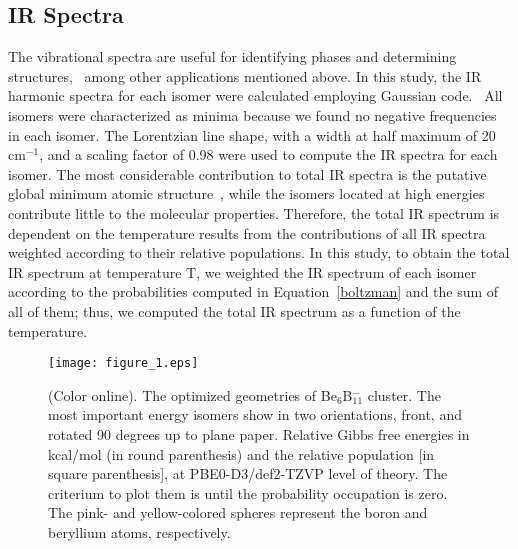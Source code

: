 \documentclass[prb,aps,preprint,showkeys,showpacs]{revtex4}
\begin{document}
\subsection{IR Spectra}
The vibrational spectra are useful for identifying phases and determining structures,~\cite{Kubicki_2019} among other applications mentioned above. In this study, the IR harmonic spectra for each isomer were calculated employing Gaussian code.~\cite{gauss} All isomers were characterized as minima because we found no negative frequencies in each isomer. The Lorentzian line shape, with a width at half maximum of 20 cm$^{-1}$, and a scaling factor of 0.98 were used to compute the IR spectra for each isomer. The most considerable contribution to total IR spectra is the putative global minimum atomic structure~\cite{Felix}, while the isomers located at high energies contribute little to the molecular properties. Therefore, the total IR spectrum is dependent on the temperature results from the contributions of all IR spectra weighted according to their relative populations. In this study, to obtain the total IR spectrum at temperature T, we weighted the IR spectrum of each isomer according to the probabilities computed in Equation~\ref{boltzman} and the sum of all of them; thus, we computed the total IR spectrum as a function of the temperature.
\begin{figure}[ht!]
\begin{center}  
  \texttt{[image: figure\_1.eps]}
\caption{(Color online). The optimized geometries of Be$_{6}$B$_{11}^{-}$ cluster. The most important energy isomers show in two orientations, front, and rotated 90 degrees up to plane paper.  Relative Gibbs free energies in kcal/mol (in round parenthesis) and the relative population [in square parenthesis], at PBE0-D3/def2-TZVP level of theory. The criterium to plot them is until the probability occupation is zero. The pink- and yellow-colored spheres represent the boron and beryllium atoms, respectively.}
\label{geometry_gibbs}
\end{center}    
\end{figure}
\end{document}
